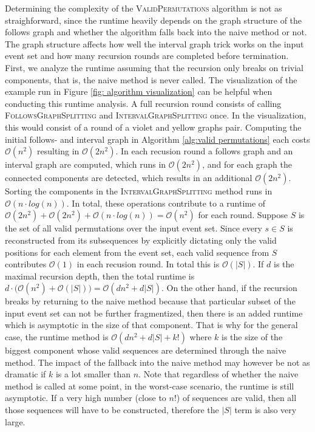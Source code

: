 Determining the complexity of the \textsc{ValidPermutations} algorithm is not as straighforward, since the runtime heavily depends on the graph structure of the follows graph and whether the algorithm falls back into the naive method or not.
The graph structure affects how well the interval graph trick works on the input event set and how many recursion rounds are completed before termination.
First, we analyze the runtime assuming that the recursion only breaks on trivial components, that is, the naive method is never called.
The visualization of the example run in Figure \ref{fig: algorithm visualization} can be helpful when conducting this runtime analysis.
A full recursion round consists of calling \textsc{FollowsGraphSplitting} and \textsc{IntervalGraphSplitting} once.
In the visualization, this would consist of a round of a violet and yellow graphs pair.
Computing the initial follows- and interval graph in Algorithm \ref{alg:valid permutations} each costs $\mathcal{O}(n^2)$ resulting in $\mathcal{O}(2n^2)$.
In each recusion round a follows graph and an interval graph are computed, which runs in $\mathcal{O}(2n^2)$, and for each graph the connected components are detected, which results in an additional $\mathcal{O}(2n^2)$.
Sorting the components in the \textsc{IntervalGraphSplitting} method runs in $\mathcal{O}(n \cdot log(n))$.
In total, these operations contribute to a runtime of $ \mathcal{O}(2n^2)+\mathcal{O}(2n^2)+\mathcal{O}(n \cdot log(n)) = \mathcal{O}(n^2)$ for each round.
Suppose $S$ is the set of all valid permutations over the input event set.
Since every $s \in S$ is reconstructed from its subsequences by explicitly dictating only the valid positions for each element from the event set, each valid sequence from $S$ contributes $\mathcal{O}(1)$ in each recusion round.
In total this is $\mathcal{O}(|S|)$.
If $d$ is the maximal recursion depth, then the total runtime is $d \cdot \big(\mathcal{O}(n^2) + \mathcal{O}(|S|) \big) = \mathcal{O}(dn^2 + d|S|)$.
On the other hand, if the recursion breaks by returning to the naive method because that particular subset of the input event set can not be further fragmentized, then there is an added runtime which is asymptotic in the size of that component.
That is why for the general case, the runtime method is $\mathcal{O}(dn^2 + d|S| + k!)$ where $k$ is the size of the biggest component whose valid sequences are determined through the naive method.
The impact of the fallback into the naive method may however be not as dramatic if $k$ is a lot smaller than $n$.
Note that regardless of whether the naive method is called at some point, in the worst-case scenario, the runtime is still asymptotic.
If a very high number (close to $n!$) of sequences are valid, then all those sequences will have to be constructed, therefore the $|S|$ term is also very large. 

